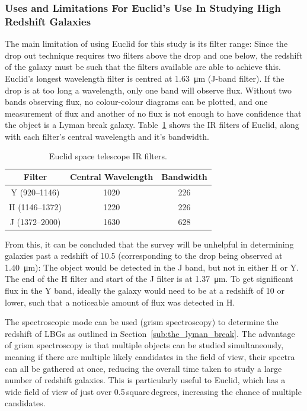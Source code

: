 	\subsubsection{Uses and Limitations For Euclid's Use In Studying High Redshift Galaxies} %
	\label{ssub:uses_and_limitations_for_euclid_s_use_in_studying_high_redshift_galaxies}
		The main limitation of using Euclid for this study is its filter range: Since the drop out technique requires two filters above the drop and one below, the redshift of the galaxy must be such that the filters available are able to achieve this. Euclid's longest wavelength filter is centred at \SI{1.63}{\micro\metre} (J-band filter). If the drop is at too long a wavelength, only one band will observe flux. Without two bands observing flux, no colour-colour diagrams can be plotted, and one measurement of flux and another of no flux is not enough to have confidence that the object is a Lyman break galaxy. Table~\ref{fig:euclid_ir_filters} shows the IR filters of Euclid, along with each filter's central wavelength and it's bandwidth.
		\begin{table}[htbp]
			\centering
				\begin{tabular}{c|c|c}
					Filter & Central Wavelength & Bandwidth \\
					\hline\hline
					Y (920--1146) & 1020 & 226 \\
					H (1146--1372) & 1220 & 226 \\
					J (1372--2000) & 1630 & 628 \\
				\end{tabular}
				\caption{Euclid space telescope IR filters.\label{fig:euclid_ir_filters}}
		\end{table}

		From this, it can be concluded that the survey will be unhelpful in determining galaxies past a redshift of 10.5 (corresponding to the drop being observed at \SI{1.40}{\micro\metre}): The object would be detected in the J band, but not in either H or Y. The end of the H filter and start of the J filter is at \SI{1.37}{\micro\metre}. To get significant flux in the Y band, ideally the galaxy would need to be at a redshift of 10 or lower, such that a noticeable amount of flux was detected in H.

		The spectroscopic mode can be used (grism spectroscopy) to determine the redshift of LBGs as outlined in Section~\ref{sub:the_lyman_break}. The advantage of grism spectroscopy is that multiple objects can be studied simultaneously, meaning if there are multiple likely candidates in the field of view, their spectra can all be gathered at once, reducing the overall time taken to study a large number of redshift galaxies. This is particularly useful to Euclid, which has a wide field of view of just over 0.5\,square\,degrees, increasing the chance of multiple candidates.

